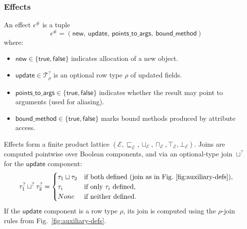 \subsubsection*{Effects}
\label{sec:effects}
An effect $\epsilon^\#$ is a tuple
\[
\epsilon^\# = (\mathsf{new},\ \mathsf{update},\ \mathsf{points\_to\_args},\ \mathsf{bound\_method})
\]
where:
\begin{itemize}
  \item $\mathsf{new} \in \{\mathsf{true},\mathsf{false}\}$ indicates allocation of a new object.
  \item $\mathsf{update} \in \mathcal{T}^?_{\rho}$ is an optional row type $\rho$ of updated fields.
  \item $\mathsf{points\_to\_args} \in \{\mathsf{true},\mathsf{false}\}$ indicates whether the result may point to arguments (used for aliasing).
  \item $\mathsf{bound\_method} \in \{\mathsf{true},\mathsf{false}\}$ marks bound methods produced by attribute access.
\end{itemize}

Effects form a finite product lattice $(\mathcal{E}, \sqsubseteq_{\mathcal{E}}, \sqcup_{\mathcal{E}}, \sqcap_{\mathcal{E}}, \top_{\mathcal{E}}, \bot_{\mathcal{E}})$.  
Joins are computed pointwise over Boolean components, and via an optional-type join $\sqcup^?$ for the $\mathsf{update}$ component:
\[
\tau_1^? \sqcup^? \tau_2^? =
\begin{cases}
\tau_1 \sqcup \tau_2 & \text{if both defined (join as in Fig.~\ref{fig:auxiliary-defs})},\\
\tau_i & \text{if only $\tau_i$ defined},\\
None & \text{if neither defined}.
\end{cases}
\]
If the $\mathsf{update}$ component is a row type $\rho$, its join is computed using the $\rho$-join rules from Fig.~\ref{fig:auxiliary-defs}.

